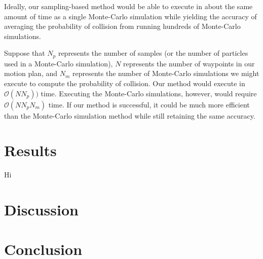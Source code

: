 \documentclass[journal]{IEEEtran}
\begin{document}
Ideally, our sampling-based method would be able to execute in about the same amount of time as a single Monte-Carlo simulation while yielding the accuracy of averaging the probability of collision from running hundreds of Monte-Carlo simulations.

Suppose that $N_p$ represents the number of samples (or the number of particles used in a Monte-Carlo simulation), $N$ represents the number of waypoints in our motion plan, and $N_m$ represents the number of Monte-Carlo simulations we might execute to compute the probability of collision. Our method would execute in $\mathcal{O}(NN_p))$ time. Executing the Monte-Carlo simulations, however, would require $\mathcal{O}(NN_pN_m)$ time. If our method is successful, it could be much more efficient than the Monte-Carlo simulation method while still retaining the same accuracy.



\section{Results}
Hi


\section{Discussion}

\section{Conclusion}

%
%
\end{document}
